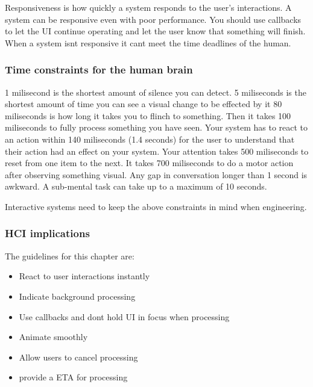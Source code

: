 \documentclass[11pt,]{article}
\providecommand{\tightlist}{%
  \setlength{\itemsep}{0pt}\setlength{\parskip}{0pt}}
\begin{document}
Responsiveness is how quickly a system responds to the user's
interactions. A system can be responsive even with poor performance. You
should use callbacks to let the UI continue operating and let the user
know that something will finish. When a system isnt responsive it cant
meet the time deadlines of the human.

\hypertarget{time-constraints-for-the-human-brain}{%
\subsubsection{Time constraints for the human
brain}\label{time-constraints-for-the-human-brain}}

1 milisecond is the shortest amount of silence you can detect. 5
miliseconds is the shortest amount of time you can see a visual change
to be effected by it 80 miliseconds is how long it takes you to flinch
to something. Then it takes 100 miliseconds to fully process something
you have seen. Your system has to react to an action within 140
miliseconds (1.4 seconds) for the user to understand that their action
had an effect on your system. Your attention takes 500 miliseconds to
reset from one item to the next. It takes 700 miliseconds to do a motor
action after observing something visual. Any gap in conversation longer
than 1 second is awkward. A sub-mental task can take up to a maximum of
10 seconds.

Interactive systems need to keep the above constraints in mind when
engineering.

\hypertarget{hci-implications}{%
\subsubsection{HCI implications}\label{hci-implications}}

The guidelines for this chapter are:

\begin{itemize}
\tightlist
\item
  React to user interactions instantly
\item
  Indicate background processing
\item
  Use callbacks and dont hold UI in focus when processing
\item
  Animate smoothly
\item
  Allow users to cancel processing
\item
  provide a ETA for processing
\end{itemize}
\end{document}
